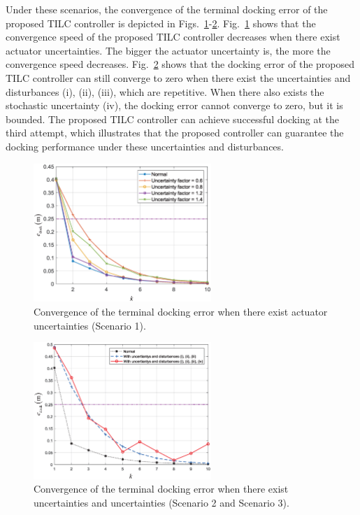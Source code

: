 Under these scenarios, the convergence of the terminal docking error of the
proposed TILC controller is depicted in Figs.~\ref{Fig_C3_S1}-\ref{Fig_C3_S2}.
Fig.~\ref{Fig_C3_S1} shows that the convergence speed of the proposed TILC
controller decreases when there exist actuator uncertainties. The bigger the
actuator uncertainty is, the more the convergence speed decreases.
Fig.~\ref{Fig_C3_S2} shows that the docking error of the proposed TILC
controller can still converge to zero when there exist the uncertainties and
disturbances (i), (ii), (iii), which are repetitive. When there also exists the
stochastic uncertainty (iv), the docking error cannot converge to zero,
but it is bounded. The proposed TILC controller can achieve successful docking
at the third attempt, which illustrates that the proposed controller can
guarantee the docking performance under these uncertainties and
disturbances.\begin{figure}[pth]
	\begin{centering}
		\includegraphics[width=0.6\textwidth]{Figures/Figs_Ch10/Scenario1} 
		\par \end{centering}\caption{Convergence of the terminal docking error when there exist actuator uncertainties (Scenario 1).}%
	\label{Fig_C3_S1}%
\end{figure}\begin{figure}[pth]
	\begin{centering}
		\includegraphics[width=0.6\textwidth]{Figures/Figs_Ch10/Scenario23} 
		\par \end{centering}\caption{Convergence of the terminal docking error when there exist uncertainties and uncertainties (Scenario 2 and Scenario 3).}%
	\label{Fig_C3_S2}%
\end{figure}

